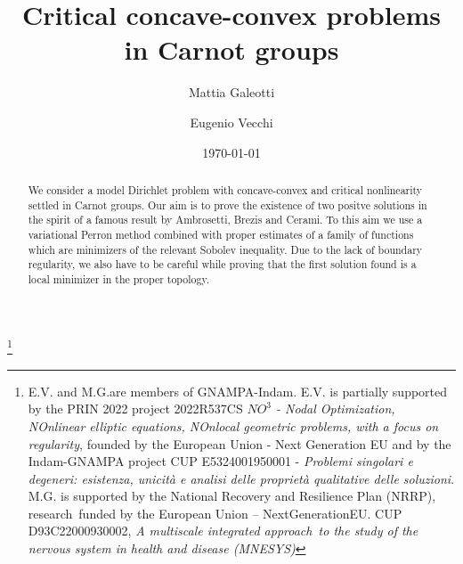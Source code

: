 \documentclass[11pt]{amsart}
\numberwithin{equation}{section} %
\theoremstyle{definition}
\begin{document}
 	\title[Crtitical Concave-convex problems in Carnot groups]{Critical concave-convex problems in Carnot groups}
 	
 
 	\author[M.\,Galeotti]{Mattia Galeotti}
 	\author[E.\,Vecchi]{Eugenio Vecchi}
 	
  	
 	\address[M.\,Galeotti]{Dipartimento di Matematica
 		\newline\indent Università  di Bologna \newline\indent
 		Piazza di Porta San Donato 5, 40126 Bologna, Italy}
 	
 	\address[E.\,Vecchi]{Dipartimento di Matematica
 		\newline\indent Università  di Bologna \newline\indent
 		Piazza di Porta San Donato 5, 40126 Bologna, Italy}
 	
 	
 	
 	\date{\today}
 	
 	\thanks{E.V. and M.G.are
 		members of GNAMPA-Indam. E.V. is
 		partially 
 		supported by the PRIN 2022 project 2022R537CS \emph{$NO^3$ - Nodal Optimization, NOnlinear elliptic equations, NOnlocal geometric problems, with a focus on regularity}, founded by the European Union - Next Generation EU and by the Indam-GNAMPA project CUP E5324001950001 - {\em Problemi singolari e degeneri: esistenza, unicità e analisi delle proprietà qualitative delle soluzioni}.
 		M.G. is supported by the National Recovery and Resilience Plan (NRRP), research funded by the European Union – NextGenerationEU.
 		CUP D93C22000930002, {\em A multiscale integrated approach to the study of the nervous system in health and disease (MNESYS)}}
 	
 	
 
 \begin{abstract}
 We consider a model Dirichlet problem with concave-convex and critical nonlinearity settled in Carnot groups. Our aim is to prove the existence of two positve solutions in the spirit of a famous result by Ambrosetti, Brezis and Cerami. To this aim we use a variational Perron method combined with proper estimates of a family of functions which are minimizers of the relevant Sobolev inequality. Due to the lack of boundary regularity, we also have to be careful while proving that the first solution found is a local minimizer in the proper topology.
 \end{abstract}	
 
\end{document}
